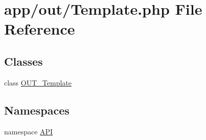 \hypertarget{Template_8php}{
\section{app/out/Template.php File Reference}
\label{df/d4d/Template_8php}
}
\subsection*{Classes}
\begin{DoxyCompactItemize}
\item 
class \hyperlink{classOUT__Template}{OUT\_\-Template}
\end{DoxyCompactItemize}
\subsection*{Namespaces}
\begin{DoxyCompactItemize}
\item 
namespace \hyperlink{namespaceAPI}{API}
\end{DoxyCompactItemize}
